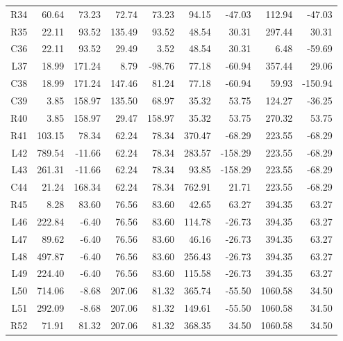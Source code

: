 \begin{longtable}{rrrrrrrrr}
R34 & 60.64 & 73.23 & 72.74 & 73.23 & 94.15 & -47.03 & 112.94 & -47.03\\
R35 & 22.11 & 93.52 & 135.49 & 93.52 & 48.54 & 30.31 & 297.44 & 30.31\\
C36 & 22.11 & 93.52 & 29.49 & 3.52 & 48.54 & 30.31 & 6.48 & -59.69\\
L37 & 18.99 & 171.24 & 8.79 & -98.76 & 77.18 & -60.94 & 357.44 & 29.06\\
C38 & 18.99 & 171.24 & 147.46 & 81.24 & 77.18 & -60.94 & 59.93 & -150.94\\
C39 & 3.85 & 158.97 & 135.50 & 68.97 & 35.32 & 53.75 & 124.27 & -36.25\\
R40 & 3.85 & 158.97 & 29.47 & 158.97 & 35.32 & 53.75 & 270.32 & 53.75\\
R41 & 103.15 & 78.34 & 62.24 & 78.34 & 370.47 & -68.29 & 223.55 & -68.29\\
L42 & 789.54 & -11.66 & 62.24 & 78.34 & 283.57 & -158.29 & 223.55 & -68.29\\
L43 & 261.31 & -11.66 & 62.24 & 78.34 & 93.85 & -158.29 & 223.55 & -68.29\\
C44 & 21.24 & 168.34 & 62.24 & 78.34 & 762.91 & 21.71 & 223.55 & -68.29\\
R45 & 8.28 & 83.60 & 76.56 & 83.60 & 42.65 & 63.27 & 394.35 & 63.27\\
L46 & 222.84 & -6.40 & 76.56 & 83.60 & 114.78 & -26.73 & 394.35 & 63.27\\
L47 & 89.62 & -6.40 & 76.56 & 83.60 & 46.16 & -26.73 & 394.35 & 63.27\\
L48 & 497.87 & -6.40 & 76.56 & 83.60 & 256.43 & -26.73 & 394.35 & 63.27\\
L49 & 224.40 & -6.40 & 76.56 & 83.60 & 115.58 & -26.73 & 394.35 & 63.27\\
L50 & 714.06 & -8.68 & 207.06 & 81.32 & 365.74 & -55.50 & 1060.58 & 34.50\\
L51 & 292.09 & -8.68 & 207.06 & 81.32 & 149.61 & -55.50 & 1060.58 & 34.50\\
R52 & 71.91 & 81.32 & 207.06 & 81.32 & 368.35 & 34.50 & 1060.58 & 34.50\\
\end{longtable}
